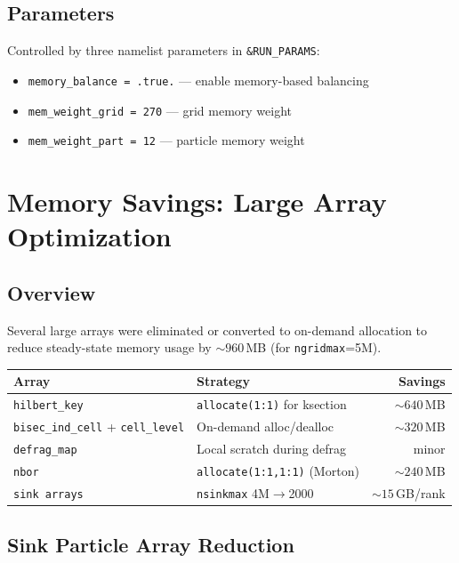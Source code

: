 \documentclass[11pt,fleqn]{book}
\begin{document}
\section{Parameters}

Controlled by three namelist parameters in \texttt{\&RUN\_PARAMS}:
\begin{itemize}[leftmargin=2em]
  \item \texttt{memory\_balance = .true.} --- enable memory-based balancing
  \item \texttt{mem\_weight\_grid = 270} --- grid memory weight
  \item \texttt{mem\_weight\_part = 12} --- particle memory weight
\end{itemize}


\chapter{Memory Savings: Large Array Optimization}

\section{Overview}

Several large arrays were eliminated or converted to on-demand allocation to reduce steady-state memory usage by ${\sim}960$\,MB (for \texttt{ngridmax}=5M).

\begin{center}
\begin{tabular}{llr}
\toprule
\textbf{Array} & \textbf{Strategy} & \textbf{Savings} \\
\midrule
\texttt{hilbert\_key} & \texttt{allocate(1:1)} for ksection & ${\sim}640$\,MB \\
\texttt{bisec\_ind\_cell} + \texttt{cell\_level} & On-demand alloc/dealloc & ${\sim}320$\,MB \\
\texttt{defrag\_map} & Local scratch during defrag & minor \\
\texttt{nbor} & \texttt{allocate(1:1,1:1)} (Morton) & ${\sim}240$\,MB \\
\texttt{sink arrays} & \texttt{nsinkmax} 4M$\to$2000 & ${\sim}15$\,GB/rank \\
\bottomrule
\end{tabular}
\end{center}

\section{Sink Particle Array Reduction}
\end{document}
